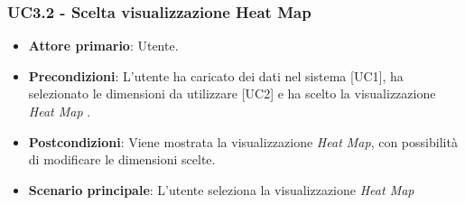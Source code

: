 \subsubsection{UC3.2 - Scelta visualizzazione Heat Map}
\begin{itemize}
	\item \textbf{Attore primario}: Utente.
	\item \textbf{Precondizioni}: L'utente ha caricato dei dati nel sistema [UC1], ha selezionato le dimensioni da utilizzare [UC2] e ha scelto la visualizzazione \textit{Heat Map} .
	\item \textbf{Postcondizioni}: Viene mostrata la visualizzazione \textit{Heat Map}, con possibilità di modificare le dimensioni scelte.
	\item \textbf{Scenario principale}: L'utente seleziona la visualizzazione \textit{Heat Map}

\end{itemize}